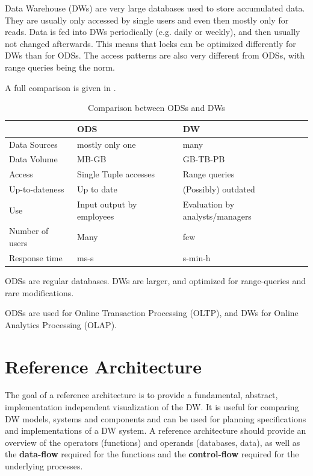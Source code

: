 \documentclass{article}
\begin{document}
Data Warehouse (DWs) are very large databases used to store accumulated data.
They are usually only accessed by single users and even then mostly only for reads.
Data is fed into DWs periodically (e.g. daily or weekly), and then usually not changed afterwards.
This means that locks can be optimized differently for DWs than for ODSs.
The access patterns are also very different from ODSs, with range queries being the norm.

A full comparison is given in .

\begin{table}[ht]
    \center
    \begin{tabular}{| l | l | l |}
        \hline
        & ODS & DW\\
        \hline
        Data Sources & mostly only one & many\\
        Data Volume & MB-GB & GB-TB-PB\\
        Access & Single Tuple accesses & Range queries\\
        Up-to-dateness & Up to date & (Possibly) outdated\\
        Use & Input output by employees & Evaluation by analysts/managers\\
        Number of users & Many & few\\
        Response time & ms-s & s-min-h\\
        \hline
    \end{tabular}
    \caption{Comparison between ODSs and DWs}
    \label{tbl:odsDwComp}
\end{table}

\begin{keypointbox}
    ODSs are regular databases.
    DWs are larger, and optimized for range-queries and rare modifications.
\end{keypointbox}

\begin{keypointbox}
    ODSs are used for Online Transaction Processing (OLTP), and DWs for Online Analytics Processing (OLAP).
\end{keypointbox}

\section{Reference Architecture}
\label{architecture}
The goal of a reference architecture is to provide a fundamental, abstract, implementation independent visualization of the DW.
It is useful for comparing DW models, systems and components and can be used for planning specifications and implementations of a DW system.
A reference architecture should provide an overview of the operators (functions) and operands (databases, data), as well as the \textbf{data-flow} required for the functions and the \textbf{control-flow} required for the underlying processes.
\end{document}
